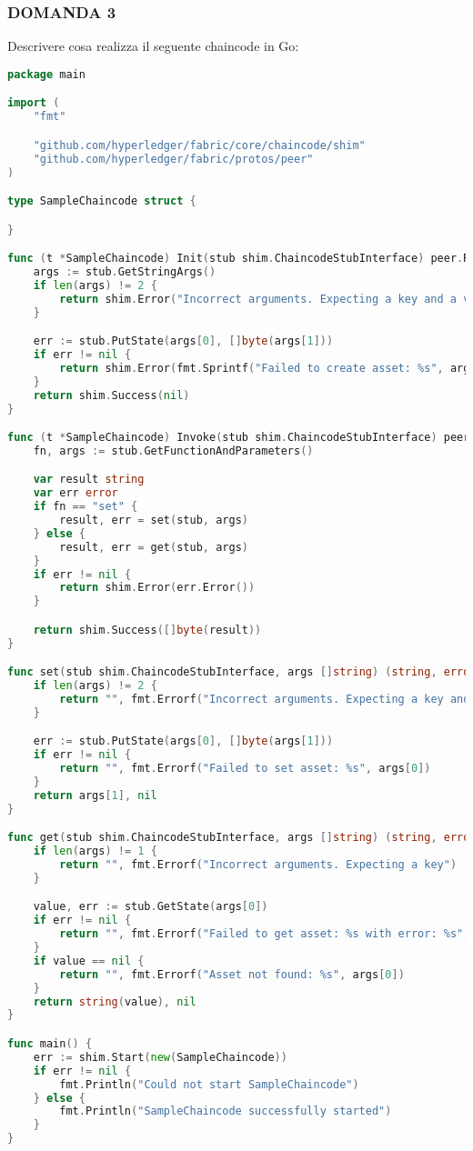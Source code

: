 \subsubsection{DOMANDA 3}
Descrivere cosa realizza il seguente chaincode in Go:
\begin{lstlisting}[language=Go]
package main

import (
    "fmt"

    "github.com/hyperledger/fabric/core/chaincode/shim"
    "github.com/hyperledger/fabric/protos/peer"
)

type SampleChaincode struct {

}

func (t *SampleChaincode) Init(stub shim.ChaincodeStubInterface) peer.Response {
    args := stub.GetStringArgs()
    if len(args) != 2 {
        return shim.Error("Incorrect arguments. Expecting a key and a value")
    }

    err := stub.PutState(args[0], []byte(args[1]))
    if err != nil {
        return shim.Error(fmt.Sprintf("Failed to create asset: %s", args[0]))
    }
    return shim.Success(nil)
}

func (t *SampleChaincode) Invoke(stub shim.ChaincodeStubInterface) peer.Response {
    fn, args := stub.GetFunctionAndParameters()

    var result string
    var err error
    if fn == "set" {
        result, err = set(stub, args)
    } else {
        result, err = get(stub, args)
    }
    if err != nil {
        return shim.Error(err.Error())
    }

    return shim.Success([]byte(result))
}

func set(stub shim.ChaincodeStubInterface, args []string) (string, error) {
    if len(args) != 2 {
        return "", fmt.Errorf("Incorrect arguments. Expecting a key and a value")
    }

    err := stub.PutState(args[0], []byte(args[1]))
    if err != nil {
        return "", fmt.Errorf("Failed to set asset: %s", args[0])
    }
    return args[1], nil
}

func get(stub shim.ChaincodeStubInterface, args []string) (string, error) {
    if len(args) != 1 {
        return "", fmt.Errorf("Incorrect arguments. Expecting a key")
    }

    value, err := stub.GetState(args[0])
    if err != nil {
        return "", fmt.Errorf("Failed to get asset: %s with error: %s", args[0], err)
    }
    if value == nil {
        return "", fmt.Errorf("Asset not found: %s", args[0])
    }
    return string(value), nil
}

func main() {
    err := shim.Start(new(SampleChaincode))
    if err != nil {
        fmt.Println("Could not start SampleChaincode")
    } else {
        fmt.Println("SampleChaincode successfully started")
    }
}

\end{lstlisting}

